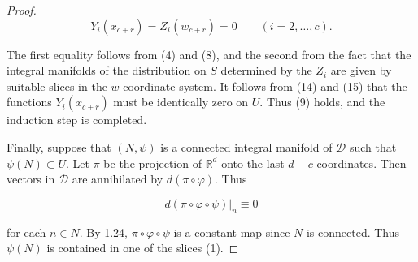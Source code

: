 \begin{proof}
	\begin{equation}
		\tag{15}\label{eq:1.60:15}
		Y_{i}(x_{c+r})=Z_{i}(w_{c+r})=0\qquad(i=2,\ldots,c).
	\end{equation}

	The first equality follows from (4) and (8), and the second from the fact that the integral manifolds of the distribution on $S$ determined by the $Z_{i}$ are given by suitable slices in the $w$ coordinate system. It follows from (14) and (15) that the functions $Y_{i}(x_{c+r})$ must be identically zero on $U$. Thus (9) holds, and the induction step is completed.

	Finally, suppose that $(N,\psi)$ is a connected integral manifold of $\mathcal{D}$ such that $\psi(N)\subset U$. Let $\pi$ be the projection of $\mathbb{R}^d$ onto the last $d-c$ coordinates. Then vectors in $\mathcal{D}$ are annihilated by $d(\pi\circ\varphi)$. Thus

	\[
		d(\pi\circ\varphi\circ\psi)|_{n}\equiv0
	\]

	for each $n \in N$. By 1.24, $\pi \circ \varphi \circ \psi$ is a constant map since $N$ is connected. Thus $\psi(N)$ is contained in one of the slices (1).

\end{proof}

